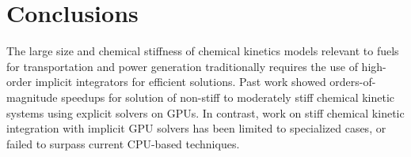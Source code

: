 \documentclass[preprint]{elsarticle}
\begin{document}
%
%

\section{Conclusions}

The large size and chemical stiffness of chemical kinetics models relevant to fuels for transportation and power generation traditionally requires the use of high-order implicit integrators for efficient solutions.
Past work showed orders-of-magnitude speedups for solution of non-stiff to moderately stiff chemical kinetic systems using explicit solvers on GPUs.
In contrast, work on stiff chemical kinetic integration with implicit GPU solvers has been limited to specialized cases, or failed to surpass current CPU-based techniques.
\end{document}
